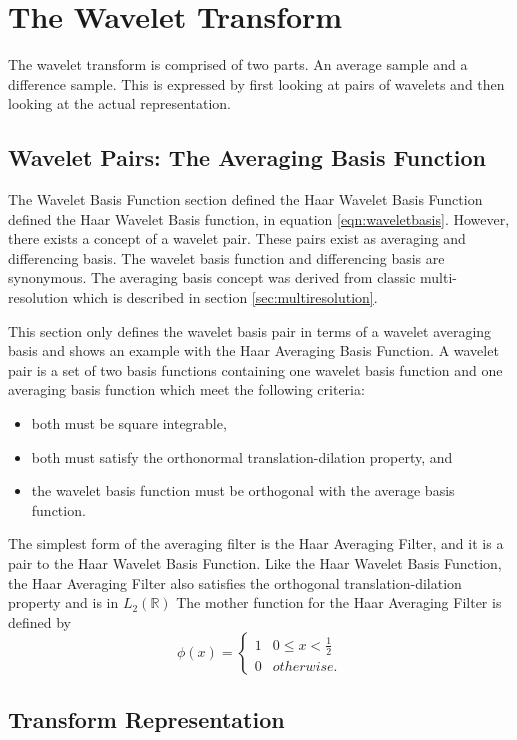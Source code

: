 \section{The Wavelet Transform}

The wavelet transform is comprised of two parts. An average sample and
a difference sample. This is expressed by first looking at pairs of
wavelets and then looking at the actual representation.

\subsection {Wavelet Pairs: The Averaging Basis Function}

The Wavelet Basis Function section defined the Haar Wavelet Basis
Function defined the Haar Wavelet Basis function, in equation
\ref{eqn:waveletbasis}.  However, there exists a concept of a wavelet
pair.  These pairs exist as averaging and differencing basis.  The
wavelet basis function and differencing basis are synonymous.  The
averaging basis concept was derived from classic multi-resolution
which is described in section \ref{sec:multiresolution}.

This section only defines the wavelet basis pair in terms of a wavelet
averaging basis and shows an example with the Haar Averaging Basis
Function.  A wavelet pair is a set of two basis functions containing
one wavelet basis function and one averaging basis function which meet
the following criteria:
\begin{itemize}
\item both must be square integrable, 
\item both must satisfy the orthonormal translation-dilation property, and
\item the wavelet basis function must be orthogonal with the average basis function.
\end{itemize}
The simplest form of the averaging filter is the Haar Averaging
Filter, and it is a pair to the Haar Wavelet Basis Function.  Like the
Haar Wavelet Basis Function, the Haar Averaging Filter also satisfies
the orthogonal translation-dilation property and is in $L_2({\mathbb R})$ The
mother function for the Haar Averaging Filter is defined by
\[
\phi(x) =
\left\{\begin{array}{cc}1 & 0\le x < \frac{1}{2} \\0 &
{otherwise.}\end{array}\right.
\]

\subsection{Transform Representation}

